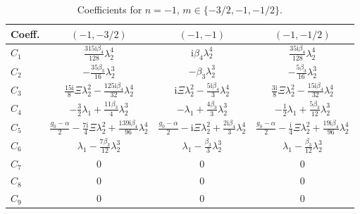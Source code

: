 \documentclass[11pt]{article}
\newcommand{\ii}{\mathrm{i}}
\begin{document}
\begin{table}[htbp]
\centering\small
\caption{Coefficients for $n=-1$, $m\in\{-3/2,-1,-1/2\}$.}
\begin{tabular}{lccc}
\toprule
Coeff. & $(-1,-3/2)$ & $(-1,-1)$ & $(-1,-1/2)$ \\
\midrule
$C_1$ & $\tfrac{315\ii\beta_4}{128}\lambda_2^4$ & $\ii\beta_4\lambda_2^4$ & $\tfrac{35\ii\beta_4}{128}\lambda_2^4$ \\
$C_2$ & $-\tfrac{35\beta_3}{16}\lambda_2^3$ & $-\beta_3\lambda_2^3$ & $-\tfrac{5\beta_3}{16}\lambda_2^3$ \\
$C_3$ & $\tfrac{15\ii}{8}\Xi\lambda_2^2-\tfrac{125\ii\beta_4}{32}\lambda_2^4$ & $\ii\Xi\lambda_2^2-\tfrac{5\ii\beta_4}{3}\lambda_2^4$ & $\tfrac{3\ii}{8}\Xi\lambda_2^2-\tfrac{15\ii\beta_4}{32}\lambda_2^4$ \\
$C_4$ & $-\tfrac32\lambda_1+\tfrac{11\beta_3}{4}\lambda_2^3$ & $-\lambda_1+\tfrac{4\beta_3}{3}\lambda_2^3$ & $-\tfrac12\lambda_1+\tfrac{5\beta_3}{12}\lambda_2^3$ \\
$C_5$ & $\tfrac{g_0-\alpha}{2}-\tfrac{7\ii}{4}\Xi\lambda_2^2+\tfrac{139\ii\beta_4}{96}\lambda_2^4$ & $\tfrac{g_0-\alpha}{2}-\ii\Xi\lambda_2^2+\tfrac{2\ii\beta_4}{3}\lambda_2^4$ & $\tfrac{g_0-\alpha}{2}-\tfrac{\ii}{4}\Xi\lambda_2^2+\tfrac{19\ii\beta_4}{96}\lambda_2^4$ \\
$C_6$ & $\lambda_1-\tfrac{7\beta_3}{12}\lambda_2^3$ & $\lambda_1-\tfrac{\beta_3}{3}\lambda_2^3$ & $\lambda_1-\tfrac{\beta_3}{12}\lambda_2^3$ \\
$C_7$ & $0$ & $0$ & $0$ \\
$C_8$ & $0$ & $0$ & $0$ \\
$C_9$ & $0$ & $0$ & $0$ \\
\bottomrule
\end{tabular}
\end{table}
\end{document}
